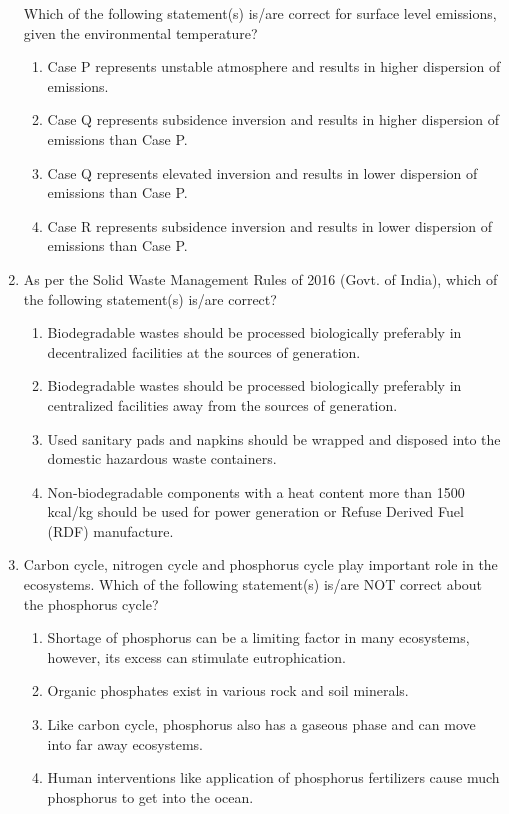 \documentclass[12pt,a4paper]{article}
\begin{document}
\begin{enumerate}
         Which of the following statement(s) is/are correct for surface level emissions, given the environmental temperature?

         \begin{enumerate}
            \item Case P represents unstable atmosphere and results in higher dispersion of emissions.
            \item Case Q represents subsidence inversion and results in higher dispersion of emissions than Case P.
            \item Case Q represents elevated inversion and results in lower dispersion of emissions than Case P.
            \item Case R represents subsidence inversion and results in lower dispersion of emissions than Case P.
         \end{enumerate}

   \item As per the Solid Waste Management Rules of 2016 (Govt. of India), which of the following statement(s) is/are correct?
         \begin{enumerate}
            \item Biodegradable wastes should be processed biologically preferably in decentralized facilities at the sources of generation.
            \item Biodegradable wastes should be processed biologically preferably in centralized facilities away from the sources of generation.
            \item Used sanitary pads and napkins should be wrapped and disposed into the domestic hazardous waste containers.
            \item Non-biodegradable components with a heat content more than 1500 kcal/kg should be used for power generation or Refuse Derived Fuel (RDF) manufacture.
         \end{enumerate}

   \item Carbon cycle, nitrogen cycle and phosphorus cycle play important role in the ecosystems. Which of the following statement(s) is/are NOT correct about the phosphorus cycle?
         \begin{enumerate}
            \item Shortage of phosphorus can be a limiting factor in many ecosystems, however, its excess can stimulate eutrophication.
            \item Organic phosphates exist in various rock and soil minerals.
            \item Like carbon cycle, phosphorus also has a gaseous phase and can move into far away ecosystems.
            \item Human interventions like application of phosphorus fertilizers cause much phosphorus to get into the ocean.
         \end{enumerate}


\end{enumerate}
\end{document}
